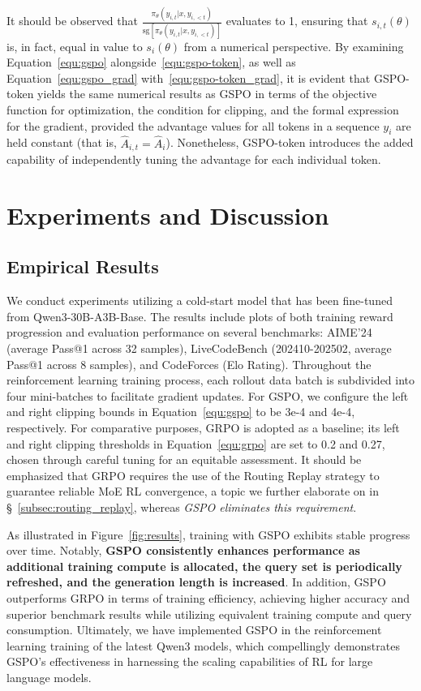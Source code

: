 It should be observed that $\frac{ \pi_{\theta} (y_{i,t} | x, y_{i,<t}) }{ \mathrm{sg} \left[ \pi_{\theta} (y_{i,t} | x, y_{i,<t}) \right] }$ evaluates to 1, ensuring that $s_{i,t}(\theta)$ is, in fact, equal in value to $s_{i}(\theta)$ from a numerical perspective. By examining Equation~\eqref{equ:gspo} alongside~\eqref{equ:gspo-token}, as well as Equation~\eqref{equ:gspo_grad} with~\eqref{equ:gspo-token_grad}, it is evident that GSPO-token yields the same numerical results as GSPO in terms of the objective function for optimization, the condition for clipping, and the formal expression for the gradient, provided the advantage values for all tokens in a sequence $y_i$ are held constant (that is, $\widehat{A}_{i,t} = \widehat{A}_{i}$). Nonetheless, GSPO-token introduces the added capability of independently tuning the advantage for each individual token.

\section{Experiments and Discussion}

\subsection{Empirical Results}

We conduct experiments utilizing a cold-start model that has been fine-tuned from Qwen3-30B-A3B-Base. The results include plots of both training reward progression and evaluation performance on several benchmarks: AIME'24 (average Pass@1 across 32 samples), LiveCodeBench (202410-202502, average Pass@1 across 8 samples), and CodeForces (Elo Rating). Throughout the reinforcement learning training process, each rollout data batch is subdivided into four mini-batches to facilitate gradient updates. For GSPO, we configure the left and right clipping bounds in Equation~\eqref{equ:gspo} to be 3e-4 and 4e-4, respectively. For comparative purposes, GRPO is adopted as a baseline; its left and right clipping thresholds in Equation~\eqref{equ:grpo} are set to 0.2 and 0.27, chosen through careful tuning for an equitable assessment. It should be emphasized that GRPO requires the use of the Routing Replay strategy to guarantee reliable MoE RL convergence, a topic we further elaborate on in \S~\ref{subsec:routing_replay}, whereas \textit{GSPO eliminates this requirement}.

As illustrated in Figure~\ref{fig:results}, training with GSPO exhibits stable progress over time. Notably, \textbf{GSPO consistently enhances performance as additional training compute is allocated, the query set is periodically refreshed, and the generation length is increased}. In addition, GSPO outperforms GRPO in terms of training efficiency, achieving higher accuracy and superior benchmark results while utilizing equivalent training compute and query consumption. Ultimately, we have implemented GSPO in the reinforcement learning training of the latest Qwen3 models, which compellingly demonstrates GSPO’s effectiveness in harnessing the scaling capabilities of RL for large language models.

